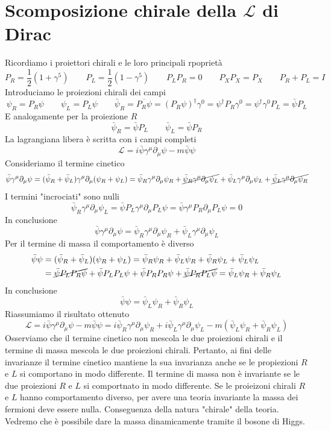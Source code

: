 \section{Scomposizione chirale della $\mathcal{L}$ di Dirac}
Ricordiamo i proiettori chirali e le loro principali rpoprietà
$$P_R = \frac{1}{2}(1 + \gamma^5) \qquad P_L = \frac{1}{2}(1 - \gamma^5) \qquad P_L P_R = 0 \qquad P_X P_X = P_X \qquad P_R + P_L = I$$
Introduciamo le proiezioni chirali dei campi
$$\psi_R = P_R \psi \qquad \psi_L = P_L \psi \qquad \bar{\psi}_R = \overline{P_R \psi} = (P_R \psi)^\dagger \gamma^0 = \psi^\dagger P_R \gamma^0 = \psi^\dagger \gamma^0 P_L = \bar{\psi} P_L$$
E analogamente per la proiezione $R$
$$\bar{\psi}_R = \bar{\psi} P_L \qquad \bar{\psi}_L = \bar{\psi} P_R$$
La lagrangiana libera è scritta con i campi completi
$$\mathcal{L} = i\bar{\psi}\gamma^\mu\partial_\mu\psi - m\bar{\psi}\psi$$
Consideriamo il termine cinetico
$$\bar{\psi}\gamma^\mu\partial_\mu\psi = (\bar{\psi}_R + \bar{\psi}_L)\gamma^\mu\partial_\mu(\psi_R + \psi_L) = \bar{\psi}_R\gamma^\mu\partial_\mu\psi_R + \cancel{\bar{\psi}_R\gamma^\mu\partial_\mu\psi_L} + \bar{\psi}_L\gamma^\mu\partial_\mu\psi_L + \cancel{\bar{\psi}_L\gamma^\mu\partial_\mu\psi_R}$$
I termini "incrociati" sono nulli
$$\bar{\psi}_R\gamma^\mu\partial_\mu\psi_L = \bar{\psi} P_L \gamma^\mu \partial_\mu P_L \psi = \bar{\psi}\gamma^\mu P_R \partial_\mu P_L \psi = 0$$
In conclusione
$$\bar{\psi}\gamma^\mu\partial_\mu\psi = \bar{\psi}_R\gamma^\mu\partial_\mu\psi_R + \bar{\psi}_L\gamma^\mu\partial_\mu\psi_L$$
Per il termine di massa il comportamento è diverso
$$\begin{aligned}
	\bar{\psi}\psi &= (\bar{\psi}_R + \bar{\psi}_L)(\psi_R + \psi_L) = \bar{\psi}_R\psi_R + \bar{\psi}_L\psi_R + \bar{\psi}_R\psi_L + \bar{\psi}_L\psi_L \\
	&= \cancel{\bar{\psi} P_L P_R \psi} + \bar{\psi} P_L P_L \psi + \bar{\psi} P_R P_R \psi + \cancel{\bar{\psi} P_R P_L \psi} = \bar{\psi}_L\psi_R + \bar{\psi}_R\psi_L
\end{aligned}$$
In conclusione
$$\bar{\psi}\psi = \bar{\psi}_L\psi_R + \bar{\psi}_R\psi_L$$
Riassumiamo il risultato ottenuto
$$\mathcal{L} = i\bar{\psi}\gamma^\mu\partial_\mu\psi - m\bar{\psi}\psi = i\bar{\psi}_R\gamma^\mu\partial_\mu\psi_R + i\bar{\psi}_L\gamma^\mu\partial_\mu\psi_L - m(\bar{\psi}_L\psi_R + \bar{\psi}_R\psi_L)$$
Osserviamo che il termine cinetico non mescola le due proiezioni chirali e il termine di massa mescola le due proiezioni chirali. Pertanto, ai fini delle invarianze il termine cinetico mantiene la sua invarianza anche se le propiezioni $R$ e $L$ si comportano in modo differente. Il termine di massa non è invariante se le due proiezioni $R$ e $L$ si comportnato in modo differente. Se le proieizoni chirali $R$ e $L$ hanno comportamento diverso, per avere una teoria invariante la massa dei fermioni deve essere nulla. Conseguenza della natura "chirale" della teoria. Vedremo che è possibile dare la massa dinamicamente tramite il bosone di Higgs.
